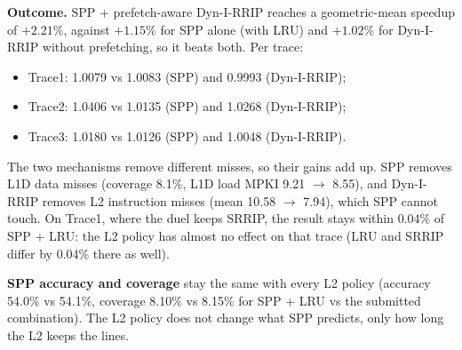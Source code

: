 \textbf{Outcome.} SPP + prefetch-aware Dyn-I-RRIP reaches a geometric-mean speedup of $\boldsymbol{+2.21\%}$, against
$+1.15\%$ for SPP alone (with LRU) and $+1.02\%$ for Dyn-I-RRIP without prefetching, so it beats both. Per trace:
\begin{itemize}
  \item Trace1: 1.0079 vs 1.0083 (SPP) and 0.9993 (Dyn-I-RRIP);
  \item Trace2: 1.0406 vs 1.0135 (SPP) and 1.0268 (Dyn-I-RRIP);
  \item Trace3: 1.0180 vs 1.0126 (SPP) and 1.0048 (Dyn-I-RRIP).
\end{itemize}
The two mechanisms remove different misses, so their gains add up. SPP removes L1D data misses (coverage 8.1\%, L1D
load MPKI 9.21 $\to$ 8.55), and Dyn-I-RRIP removes L2 instruction misses (mean 10.58 $\to$ 7.94), which SPP cannot
touch. On Trace1, where the duel keeps SRRIP, the result stays within 0.04\% of SPP + LRU: the L2 policy has almost no
effect on that trace (LRU and SRRIP differ by 0.04\% there as well).

\textbf{SPP accuracy and coverage} stay the same with every L2 policy (accuracy 54.0\% vs 54.1\%, coverage 8.10\% vs
8.15\% for SPP + LRU vs the submitted combination). The L2 policy does not change what SPP predicts, only how long the
L2 keeps the lines.
